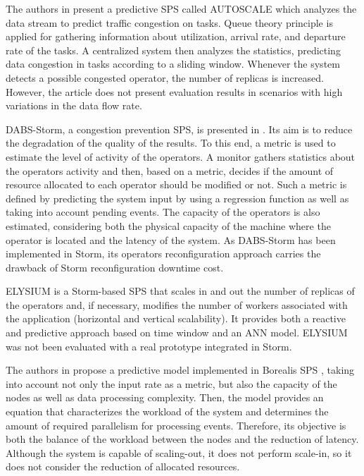 The authors in \cite{KombiLL17} present a predictive SPS called AUTOSCALE which analyzes the data stream to predict traffic congestion on tasks. Queue theory principle is applied for gathering information about utilization, arrival rate, and departure rate of the tasks. A centralized system then analyzes the statistics, predicting data congestion in tasks according to a sliding window. Whenever the system detects a possible congested operator, the number of replicas is increased. However, the article does not present evaluation results in scenarios with high variations in the data flow rate.

DABS-Storm, a congestion prevention SPS, is presented in \cite{KombiLLRB19}. Its aim is to reduce the degradation of the quality of the results. To this end, a metric is used to estimate the level of activity of the operators. A monitor gathers statistics about the operators activity and then, based on a metric, decides if the amount of resource allocated to each operator should be modified or not. Such a metric is defined by predicting the system input by using a regression function as well as taking into account pending events. The capacity of the operators is also estimated, considering both the physical capacity of the machine where the operator is located and the latency of the system. As DABS-Storm has been implemented in Storm, its operators reconfiguration approach carries the drawback of Storm reconfiguration downtime cost. 

ELYSIUM \cite{LombardiABQ18} is a Storm-based SPS that scales in and out
the number of replicas of the operators and, if necessary, modifies the number of workers associated with the application (horizontal and vertical scalability). It provides both a reactive and predictive approach based on time window and an ANN model. ELYSIUM was not been evaluated with a real prototype integrated in Storm.

The authors in \cite{BalkesenTO13} propose a predictive model implemented in Borealis SPS \cite{AbadiABCCHLMRRTXZ05}, taking into account not only the input rate as a metric, but also the capacity of the nodes as well as data processing complexity. Then, the model provides an equation that characterizes the workload of the system and determines the amount of required parallelism for processing events. Therefore, its objective is both the balance of the workload between the nodes and the reduction of latency. Although the system is capable of scaling-out, it does not perform scale-in, so it does not consider the reduction of allocated resources.

